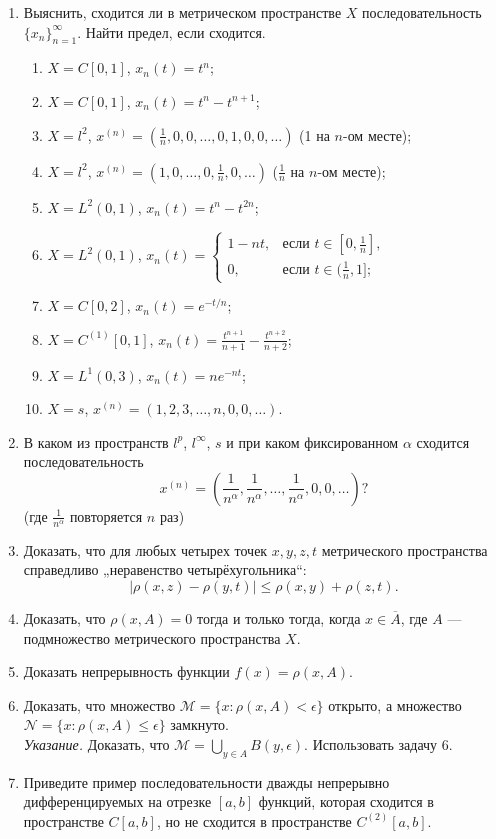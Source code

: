 \documentclass[12pt,a4paper]{article}
\begin{document}
\begin{enumerate}
\item Выяснить, сходится ли в метрическом пространстве $X$ последовательность $\{x_{n}\}_{n=1}^{\infty}$. Найти предел, если сходится.
\begin{enumerate}[label=\alph*)]
\item $X = C[0, 1]$, $x_{n}(t) = t^{n}$;
\item $X = C[0, 1]$, $x_{n}(t) = t^{n} - t^{n+1}$;
\item $X = l^{2}$, $x^{(n)} = (\frac{1}{n}, 0, 0, \dots, 0, 1, 0, 0, \dots)$ (1 на $n$-ом месте);
\item $X = l^{2}$, $x^{(n)} = (1, 0, \dots, 0, \frac{1}{n}, 0, \dots)$ ($\frac{1}{n}$ на $n$-ом месте);
\item $X = L^{2}(0, 1)$, $x_{n}(t) = t^{n} - t^{2n}$;
\item $X = L^{2}(0, 1)$, $x_{n}(t) =
\begin{cases} 1-nt, & \text{если } t\in[0, \frac{1}{n}], \\ 0, & \text{если } t\in(\frac{1}{n}, 1];
\end{cases}$
\item $X = C[0, 2]$, $x_{n}(t) = e^{-t/n}$;
\item $X = C^{(1)}[0, 1]$, $x_{n}(t) = \frac{t^{n+1}}{n+1} - \frac{t^{n+2}}{n+2}$;
\item $X = L^{1}(0, 3)$, $x_{n}(t) = n e^{-nt}$;
\item $X = s$, $x^{(n)} = (1, 2, 3, \dots, n, 0, 0, \dots)$.
\end{enumerate}

\item В каком из пространств $l^{p}$, $l^{\infty}$, $s$ и при каком фиксированном $\alpha$ сходится последовательность
$$x^{(n)} = \left(\frac{1}{n^{\alpha}}, \frac{1}{n^{\alpha}}, \dots, \frac{1}{n^{\alpha}}, 0, 0, \dots \right)?$$ (где $\frac{1}{n^{\alpha}}$ повторяется $n$ раз)

\item Доказать, что для любых четырех точек $x, y, z, t$ метрического пространства справедливо „неравенство четырёхугольника“:
$$|\rho(x, z) - \rho(y, t)| \le \rho(x, y) + \rho(z, t).$$

\item Доказать, что $\rho(x, A) = 0$ тогда и только тогда, когда $x \in \overline{A}$, где $A$ — подмножество метрического пространства $X$.

\item Доказать непрерывность функции $f(x) = \rho(x, A)$.

\item Доказать, что множество $\mathcal{M} = \{x : \rho(x, A) < \epsilon\}$ открыто, а множество $\mathcal{N} = \{x : \rho(x, A) \le \epsilon\}$ замкнуто.\\
\textit{Указание.} Доказать, что $\mathcal{M} = \bigcup_{y\in A} B(y, \epsilon)$. Использовать задачу 6.

\item Приведите пример последовательности дважды непрерывно дифференцируемых на отрезке $[a, b]$ функций, которая сходится в пространстве $C[a, b]$, но не сходится в пространстве $C^{(2)}[a, b]$.
\end{enumerate}
\end{document}
